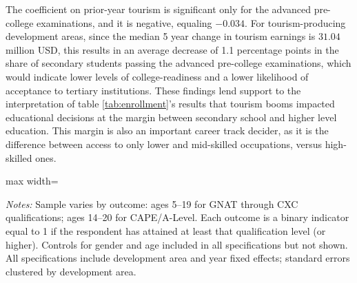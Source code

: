 \documentclass[12pt]{article}
\newcommand*{\TableLagOnePath}{../Paper_3_Tables/Lagged_1Year_Tables}
\begin{document}
		 The coefficient on prior-year tourism is significant only for the advanced pre-college examinations, and it is negative, equaling $-0.034$. For tourism-producing development areas, since the median 5 year change in tourism earnings is $31.04$ million USD, this results in an average decrease of 1.1 percentage points in the share of secondary students passing the advanced pre-college examinations, which would indicate lower levels of college-readiness and a lower likelihood of acceptance to tertiary institutions. These findings lend support to the interpretation of table \ref{tab:enrollment}'s results that tourism booms impacted educational decisions at the margin between secondary school and higher level education. This margin is also an important career track decider, as it is the difference between access to only lower and mid-skilled occupations, versus high-skilled ones. 
		
			\begin{table}[h]
			\centering
			\begin{adjustbox}{max width=\textwidth}
				\begin{threeparttable}
					\caption{Examination Attainment, IV Estimates}
					\label{tab:exams}
					{\small}
					\begin{tablenotes}
						\small
						\item \textit{Notes:} Sample varies by outcome: ages 5--19 for GNAT through CXC qualifications; ages 14--20 for CAPE/A-Level. Each outcome is a binary indicator equal to 1 if the respondent has attained at least that qualification level (or higher). Controls for gender and age included in all specifications but not shown. All specifications include development area and year fixed effects; standard errors clustered by development area.
					\end{tablenotes}
				\end{threeparttable}
			\end{adjustbox}
		\end{table}
		
		
%		
\end{document}
